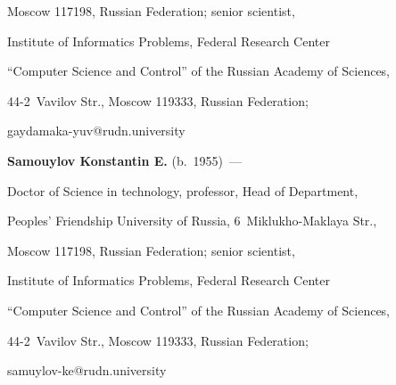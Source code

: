 Moscow 117198, Russian Federation; senior scientist, 


Institute of Informatics Problems, Federal Research Center 


``Computer Science and Control'' of the Russian Academy of Sciences, 


44-2~Vavilov Str., Moscow 119333, Russian Federation; 


\mbox{gaydamaka-yuv@rudn.university}





\vspace*{3pt}





\noindent


\textbf{Samouylov Konstantin E.} (b.\ 1955)~--- 


Doctor of Science in technology, professor, Head of Department, 


Peoples' Friendship University of Russia, 6~Miklukho-Maklaya Str., 


Moscow 117198, Russian Federation; senior scientist, 


Institute of Informatics Problems, Federal Research Center 


``Computer Science and Control'' of the Russian Academy of Sciences, 


44-2~Vavilov Str., Moscow 119333, Russian Federation; 


\mbox{samuylov-ke@rudn.university}


\label{end\stat}





\renewcommand{\bibname}{\protect\rm Литература}       



